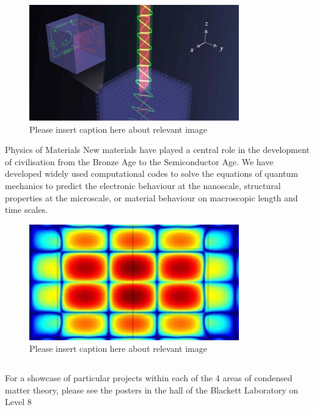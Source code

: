 \documentclass[xcolor={table}]{beamer}
\begin{document}
\begin{frame}[fragile=singleslide,t]
\begin{columns}[onlytextwidth,T]
\begin{column}{.47\textwidth}
\begin{figure}
    \includegraphics[width=1\columnwidth, height=0.2\textheight]{correlated.jpg}
    \caption{\footnotesize Please insert caption here about relevant image}
\end{figure}

\begin{block}{Physics of Materials}
New materials have played a central role in the development of civilisation from
the Bronze Age to the Semiconductor Age. We have developed widely used
computational codes to solve the equations of quantum mechanics to predict the
electronic behaviour at the nanoscale, structural properties at the microscale,
or material behaviour on macroscopic length and time scales.
\end{block}

\begin{figure}
    \includegraphics[width=\columnwidth, height=0.2\textheight]{simulation_materials.jpg}
    \caption{\footnotesize Please insert caption here about relevant image}
\end{figure}

\end{column}
\end{columns}

\begin{tcolorbox}[colback=BackgroundBlue,colframe=ICDeepBlue,fontupper=\color{ICDeepBlue}]
    For a showcase of particular projects within each of the 4 areas of
    condensed matter theory, please see the posters in the hall of the Blackett
    Laboratory on Level 8
\end{tcolorbox}

\end{frame}
\end{document}

